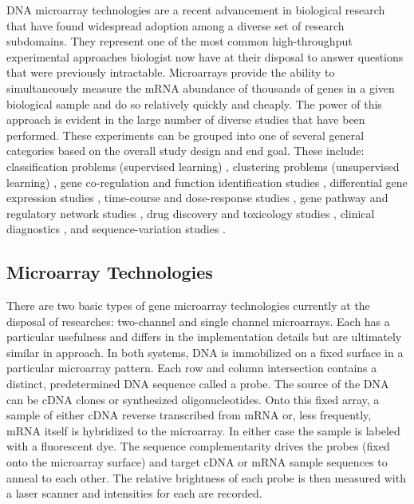 DNA microarray technologies are a recent advancement in biological research
that have found widespread adoption among a diverse set of research subdomains.
They represent one of the most common high-throughput experimental approaches
biologist now have at their disposal to answer questions that were previously
intractable. Microarrays provide the ability to simultaneously measure the mRNA
abundance of thousands of genes in a given biological sample and do so
relatively quickly and cheaply.  The power of this approach is evident in the
large number of diverse studies that have been performed.  These experiments
can be grouped into one of several general categories based on the overall
study design and end goal.  These include: classification problems (supervised
learning) \cite{Dudoit2003ICM}, clustering problems (unsupervised learning)
\cite{Azuaje2003cge,Stanford2003cac}, gene co-regulation and function
identification studies \cite{PMID_12413821}, differential gene expression
studies \cite{PMID_15843092,PMID_15867208}, time-course and dose-response
studies \cite{PMID_12443997}, gene pathway and regulatory network studies
\cite{PMID_16216773,PMID_16825123}, drug discovery and toxicology studies
\cite{PMID_16512775,PMID_16700885,PMID_16880944,PMID_17195470}, clinical
diagnostics \cite{PMID_16918486}, and sequence-variation studies
\cite{PMID_17265721}.

\subsection{Microarray Technologies}

There are two basic types of gene microarray technologies currently at the
disposal of researches: two-channel and single channel microarrays.  Each has a
particular usefulness and differs in the implementation details but are
ultimately similar in approach.  In both systems, DNA is immobilized on a fixed
surface in a particular microarray pattern.  Each row and column intersection
contains a distinct, predetermined DNA sequence called a probe. The source of
the DNA can be cDNA clones or synthesized oligonucleotides.  Onto this fixed
array, a sample of either cDNA reverse transcribed from mRNA or, less
frequently, mRNA itself is hybridized to the microarray.  In either case the sample
is labeled with a fluorescent dye.  The sequence complementarity drives the
probes (fixed onto the microarray surface) and target cDNA or mRNA sample sequences
to anneal to each other.  The relative brightness of each probe is then
measured with a laser scanner and intensities for each are recorded.


